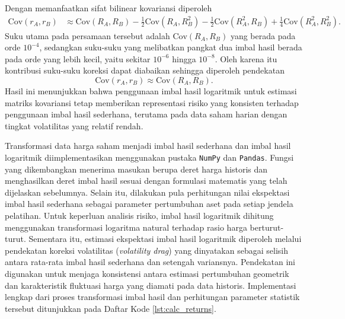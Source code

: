 Dengan memanfaatkan sifat bilinear kovariansi diperoleh
\begin{equation}
\begin{aligned}
\text{Cov}(r_A,r_B)
&\approx
\text{Cov}(R_A,R_B)
-\frac{1}{2}\text{Cov}(R_A,R_B^2)-\frac{1}{2}\text{Cov}(R_A^2,R_B)+\frac{1}{4}\text{Cov}(R_A^2,R_B^2).
\end{aligned}
\end{equation}
Suku utama pada persamaan tersebut adalah $\text{Cov}(R_A,R_B)$ yang berada pada orde $10^{-4}$, sedangkan suku-suku yang melibatkan pangkat dua imbal hasil berada pada orde yang lebih kecil, yaitu sekitar $10^{-6}$ hingga $10^{-8}$. Oleh karena itu kontribusi suku-suku koreksi dapat diabaikan sehingga diperoleh pendekatan
\begin{equation}
\text{Cov}(r_A,r_B)
\approx
\text{Cov}(R_A,R_B).
\end{equation}
Hasil ini menunjukkan bahwa penggunaan imbal hasil logaritmik untuk estimasi matriks kovariansi tetap memberikan representasi risiko yang konsisten terhadap penggunaan imbal hasil sederhana, terutama pada data saham harian dengan tingkat volatilitas yang relatif rendah.


Transformasi data harga saham menjadi imbal hasil sederhana dan imbal hasil logaritmik diimplementasikan menggunakan pustaka \texttt{NumPy} dan \texttt{Pandas}. Fungsi yang dikembangkan menerima masukan berupa deret harga historis dan menghasilkan deret imbal hasil sesuai dengan formulasi matematis yang telah dijelaskan sebelumnya. Selain itu, dilakukan pula perhitungan nilai ekspektasi imbal hasil sederhana sebagai parameter pertumbuhan aset pada setiap jendela pelatihan. Untuk keperluan analisis risiko, imbal hasil logaritmik dihitung menggunakan transformasi logaritma natural terhadap rasio harga berturut-turut. Sementara itu, estimasi ekspektasi imbal hasil logaritmik diperoleh melalui pendekatan koreksi volatilitas (\textit{volatility drag}) yang dinyatakan sebagai selisih antara rata-rata imbal hasil sederhana dan setengah variansnya. Pendekatan ini digunakan untuk menjaga konsistensi antara estimasi pertumbuhan geometrik dan karakteristik fluktuasi harga yang diamati pada data historis. Implementasi lengkap dari proses transformasi imbal hasil dan perhitungan parameter statistik tersebut ditunjukkan pada Daftar Kode \ref{lst:calc_returns}.


